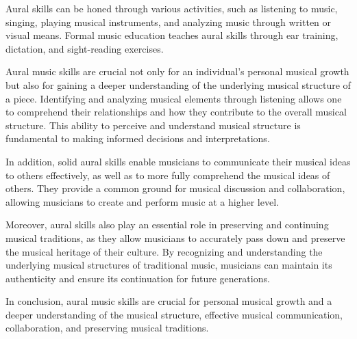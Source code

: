 Aural skills can be honed through various activities, such as listening to music, singing, playing musical instruments, and analyzing music through written or visual means. Formal music education teaches aural skills through ear training, dictation, and sight-reading exercises.

Aural music skills are crucial not only for an individual's personal musical growth but also for gaining a deeper understanding of the underlying musical structure of a piece. Identifying and analyzing musical elements through listening allows one to comprehend their relationships and how they contribute to the overall musical structure. This ability to perceive and understand musical structure is fundamental to making informed decisions and interpretations.

In addition, solid aural skills enable musicians to communicate their musical ideas to others effectively, as well as to more fully comprehend the musical ideas of others. They provide a common ground for musical discussion and collaboration, allowing musicians to create and perform music at a higher level.

Moreover, aural skills also play an essential role in preserving and continuing musical traditions, as they allow musicians to accurately pass down and preserve the musical heritage of their culture. By recognizing and understanding the underlying musical structures of traditional music, musicians can maintain its authenticity and ensure its continuation for future generations.

In conclusion, aural music skills are crucial for personal musical growth and a deeper understanding of the musical structure, effective musical communication, collaboration, and preserving musical traditions.






